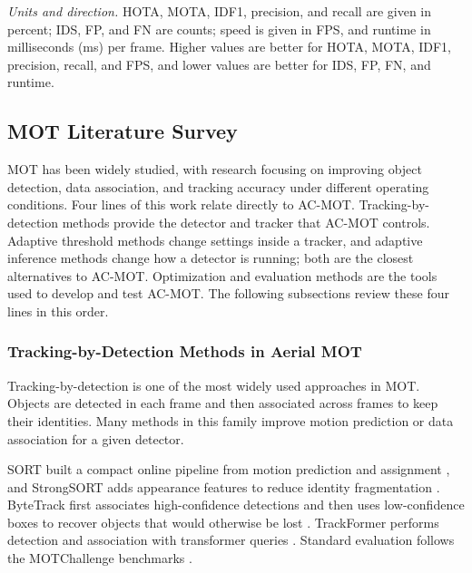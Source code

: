 \documentclass[journal]{new-aiaa}
\begin{document}
\emph{Units and direction.} HOTA, MOTA, IDF1, precision, and recall are given
in percent; IDS, FP, and FN are counts; speed is given in FPS, and runtime in
milliseconds (ms) per frame. Higher values are better for HOTA, MOTA, IDF1,
precision, recall, and FPS, and lower values are better for IDS, FP, FN, and
runtime.

\subsection{MOT Literature Survey}
MOT has been widely studied, with research focusing on improving object detection, data association, and tracking accuracy under different operating conditions. Four lines of this work relate directly to AC-MOT. Tracking-by-detection methods provide the detector and tracker that AC-MOT controls. Adaptive threshold methods change settings inside a tracker, and adaptive inference methods change how a detector is running; both are the closest alternatives to AC-MOT. Optimization and evaluation methods are the tools used to develop and test AC-MOT. The following subsections review these four lines in this order.

\subsubsection{Tracking-by-Detection Methods in Aerial MOT}\label{sec:hosts}
Tracking-by-detection is one of the most widely used approaches in MOT. Objects are detected in each frame and then associated across frames to keep their identities. Many methods in this family improve motion prediction or data association for a given detector.

SORT built a compact online pipeline from motion prediction and assignment
\cite{bewley2016sort}, and StrongSORT adds appearance features to reduce
identity fragmentation \cite{du2023strongsort}. ByteTrack first associates
high-confidence detections and then uses low-confidence boxes to recover
objects that would otherwise be lost \cite{zhang2022bytetrack}. TrackFormer
performs detection and association with transformer queries
\cite{meinhardt2022trackformer}. Standard evaluation follows the MOTChallenge
benchmarks \cite{dendorfer2021motchallenge}.
\end{document}
